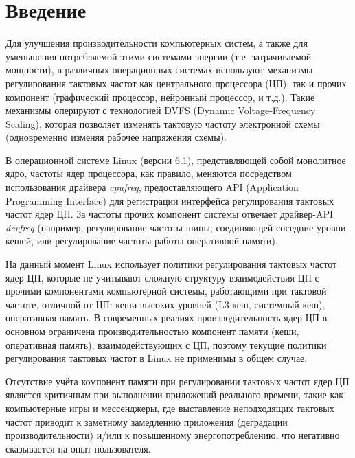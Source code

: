 \section{Введение}
\label{sec:Section0} 

    Для улучшения производительности компьютерных систем, а также для уменьшения потребляемой
    этими системами энергии (т.е. затрачиваемой мощности), в различных операционных системах
    используют механизмы регулирования тактовых частот как центрального процессора (ЦП),
    так и прочих компонент (графический процессор, нейронный процессор, и т.д.). Такие механизмы
    оперируют с технологией DVFS (Dynamic Voltage-Frequency Scaling), которая позволяет изменять
    тактовую частоту электронной схемы (одновременно изменяя рабочее напряжения схемы).

    В операционной системе Linux (версии 6.1), представляющей собой монолитное ядро,
    частоты ядер процессора, как правило, меняются посредством использования драйвера
    \textit{cpufreq}, предоставляющего API (Application Programming Interface) для регистрации
    интерфейса регулирования тактовых частот ядер ЦП. За частоты прочих компонент системы отвечает
    драйвер-API \textit{devfreq} (например, регулирование частоты шины, соединяющей соседние
    уровни кешей, или регулирование частоты работы оперативной памяти).

    На данный момент Linux использует политики регулирования тактовых частот ядер ЦП, которые
    не учитывают сложную структуру взаимодействия ЦП с прочими компонентами компьютерной системы,
    работающими при тактовой частоте, отличной от ЦП: кеши высоких уровней (L3 кеш, системный кеш),
    оперативная память. В современных реалиях производительность ядер ЦП в основном ограничена
    производительностью компонент памяти (кеши, оперативная память), взаимодействующих с ЦП,
    поэтому текущие политики регулирования тактовых частот в Linux не применимы в общем случае.

    Отсутствие учёта компонент памяти при регулировании тактовых частот ядер ЦП является критичным
    при выполнении приложений реального времени, такие как компьютерные игры и мессенджеры, где
    выставление неподходящих тактовых частот приводит к заметному замедлению приложения (деградации
    производительности) и/или к повышенному энергопотреблению, что негативно сказывается на
    опыт пользователя.

